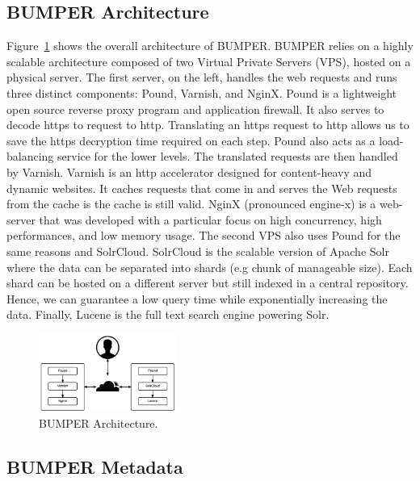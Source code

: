\documentclass[conference]{IEEEtran}
\begin{document}
\subsection{BUMPER Architecture}
\label{sub:BUMPER Architecture}

Figure~\ref{fig:bumper-architecture} shows the overall architecture of BUMPER.
BUMPER relies on a highly scalable architecture composed
of two Virtual Private Servers (VPS), hosted on a physical
server.
The first server, on the left, handles the web requests and
runs three distinct components: Pound, Varnish, and NginX.
Pound is a lightweight open source reverse proxy program
and application firewall.
It also serves to decode https to request to http.
Translating an https request to http allows us to save the https decryption time required on each step.
Pound also acts as a load-balancing service for the lower levels.
The translated requests are then handled by Varnish.
Varnish is an http accelerator designed for content-heavy and dynamic websites.
It caches requests that come in and serves the Web requests from the cache is the cache is still valid.
NginX (pronounced engine-x) is a web-server that was developed with a particular focus on high concurrency, high performances, and low memory usage.
The second VPS also uses Pound for the same reasons and SolrCloud.
SolrCloud is the scalable version of Apache Solr where the data can be separated into shards (e.g chunk of manageable size).
Each shard can be hosted on a different server but still indexed in a central repository.
Hence, we can guarantee a low query time while exponentially increasing the data.
Finally, Lucene is the full text search engine powering Solr.

\begin{figure}[h!]
  \centering
    \includegraphics[width=0.4\textwidth]{media/archi.png}
    \caption{BUMPER Architecture.\label{fig:bumper-architecture}}
\end{figure}

\subsection{BUMPER Metadata}
\label{sub:BUMPER Metadata}
\end{document}
